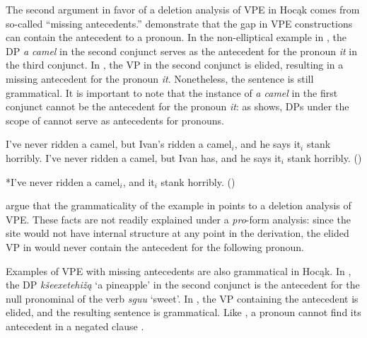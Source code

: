 \documentclass[output=paper]{LSP/langsci}
\begin{document}
 
The second argument in favor of a deletion analysis of VPE in Hocąk comes from so-called ``missing antecedents.'' \citet{HankamerSag1976} demonstrate that the gap in  VPE constructions can contain the antecedent to a pronoun. In the non-elliptical example in , the DP \emph{a camel} in the second conjunct serves as the antecedent for the pronoun \emph{it} in the third conjunct. In , the VP in the second conjunct is elided, resulting in a missing antecedent for the pronoun \emph{it}. Nonetheless, the sentence is still grammatical. It is important to note that the instance of \emph{a camel} in the first conjunct cannot be the antecedent for the pronoun \emph{it}: as  shows, DPs under the scope of  cannot serve as antecedents for pronouns.
 
\ea
\ea\label{ex:johnson:49a}
I've never ridden a camel, but Ivan's ridden a camel$_i$, and he says it$_i$ stank horribly.
\vspace{12pt}
\ex\label{ex:johnson:49b} 
I've never ridden a camel, but Ivan has, and he says it$_i$ stank horribly. (\citealt[403]{HankamerSag1976})
\z
\z
 
\ea\label{ex:johnson:50}
*I've never ridden a camel$_i$, and it$_i$ stank horribly. (\citealt[404]{HankamerSag1976})\\
\z 

\citet{HankamerSag1976} argue that the grammaticality of the example in  points to a deletion analysis of VPE. These facts are not readily explained under a \emph{pro}-form analysis: since the  site would not have internal structure at any point in the derivation, the elided VP in  would never contain the antecedent for the following pronoun. 

 
Examples of VPE with missing antecedents are also grammatical in Hocąk. In , the DP \emph{kšeexetehižą} `a pineapple' in the second conjunct is the antecedent for the null pronominal  of the verb \emph{sguu} `sweet'. In , the VP containing the antecedent is elided, and the resulting sentence is grammatical. Like , a pronoun cannot find its antecedent in a negated clause .
 
\end{document}
